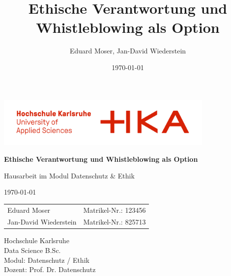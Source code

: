 \documentclass[
    12pt,               %
    a4paper,            %
    ngerman             %
]{scrartcl}
\title{Ethische Verantwortung und Whistleblowing als Option}
\author{Eduard Moser, Jan-David Wiederstein}
\date{\today}
\begin{document}
\begin{titlepage}
    \centering
    
    \vfill 
    \includegraphics[width=0.8\textwidth]{logo.png}\par\vspace{1cm}
    
    {\Huge \bfseries Ethische Verantwortung und Whistleblowing als Option\par} 
    
    \vspace{0.5cm}
    
    {\LARGE Hausarbeit im Modul Datenschutz \& Ethik\par} 

    \vspace{0.5cm}

    {\large \today\par} 

    \vspace{1.5cm} 

    \large
    \begin{tabular}{l l}
        Eduard Moser & Matrikel-Nr.: 123456 \\
        Jan-David Wiederstein & Matrikel-Nr.: 825713 \\
    \end{tabular}

    \vfill

    {\normalsize
    Hochschule Karlsruhe \\
    Data Science B.Sc. \\
    Modul: Datenschutz / Ethik \\
    Dozent: Prof. Dr. Datenschutz
    \par}
    
\end{titlepage}

\end{document}
